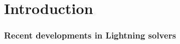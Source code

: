 
\section{Introduction}



\begin{frame}
\frametitle{Recent developments in Lightning solvers}
\begin{figure}
	\captionsetup{position=top}
	\centering
	\vfill
\end{figure}
\end{frame}
\endinput


\begin{frame}
\frametitle{Lightning solvers use rational functions to efficiently solve numerical PDEs.}
\centering
\begin{figure}
	\vfill
	\texttt{[image: Figures/step\_eddy2]}
	
	\vfill
	\subcaptionbox*{$-\infty\xleftarrow{\hspace*{0.4\linewidth}}x\xrightarrow{\hspace*{0.4\linewidth}}\infty$}{
		\hfill\texttt{[image: Figures/chan\_soln]}\hspace*{\fill}}
	
	
\end{figure}
\end{frame}